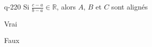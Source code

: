 \begin{truefalse}{q-220}
Si $\frac{c-a}{b-a} \in \mathbb{R}$, alors $A$, $B$ et $C$ sont alignés
\item* Vrai
\item Faux
\end{truefalse}

